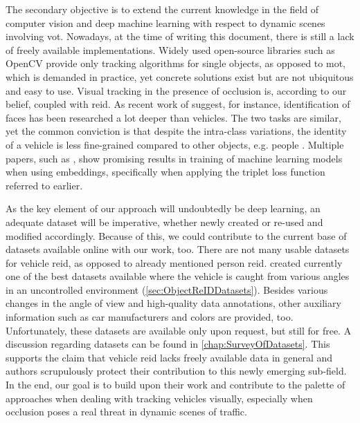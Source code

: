 The secondary objective is to extend the current knowledge in the field of computer vision and deep machine learning with respect to dynamic scenes involving \gls{vot}. Nowadays, at the time of writing this document, there is still a lack of freely available implementations. Widely used open-source libraries such as OpenCV \cite{opencv_library} provide only tracking algorithms for single objects, as opposed to \gls{mot}, which is demanded in practice, yet concrete solutions exist but are not ubiquitous and easy to use. Visual tracking in the presence of occlusion is, according to our belief, coupled with \gls{reid}. As recent work of \cite{Kuma2019} suggest, for instance, identification of faces has been researched a lot deeper than vehicles. The two tasks are similar, yet the common conviction is that despite the intra-class variations, the identity of a vehicle is less fine-grained compared to other objects, e.g. people \cite{Kuma2019}. Multiple papers, such as \cite{Schroff2015, Hermans2017}, show promising results in training of machine learning models when using embeddings, specifically when applying the triplet loss function referred to earlier.

As the key element of our approach will undoubtedly be deep learning, an adequate dataset will be imperative, whether newly created or re-used and modified accordingly. Because of this, we could contribute to the current base of datasets available online with our work, too. There are not many usable datasets for vehicle \gls{reid}, as opposed to already mentioned person \gls{reid}. \cite{Liu2018, yan2017exploiting} created currently one of the best datasets available where the vehicle is caught from various angles in an uncontrolled environment (\cref{sec:ObjectReIDDatasets}). Besides various changes in the angle of view and high-quality data annotations, other auxiliary information such as car manufacturers and colors are provided, too. Unfortunately, these datasets are available only upon request, but still for free. A discussion regarding datasets can be found in \cref{chap:SurveyOfDatasets}. This supports the claim that vehicle \gls{reid} lacks freely available data in general and authors scrupulously protect their contribution to this newly emerging sub-field. In the end, our goal is to build upon their work and contribute to the palette of approaches when dealing with tracking vehicles visually, especially when occlusion poses a real threat in dynamic scenes of traffic.
